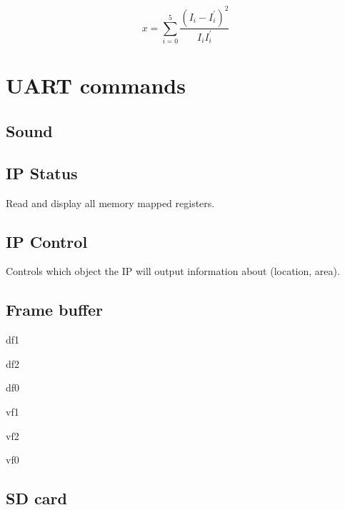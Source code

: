 \documentclass[]{article}
\providecommand{\tightlist}{%
  \setlength{\itemsep}{0pt}\setlength{\parskip}{0pt}}
\begin{document}
\[
x = \sum_{i=0}^5 \frac{(I_i - I^\prime_i) ^ 2}{I_i I^\prime_i}
\]

\section{UART commands}\label{uart-commands}

\subsection{Sound}\label{sound}

\subsection{IP Status}\label{ip-status}

\begin{description}
\tightlist
\item[\texttt{ipinfo}]
Read and display all memory mapped registers.
\end{description}

\subsection{IP Control}\label{ip-control}

\begin{description}
\tightlist
\item[\texttt{setobjid}]
Controls which object the IP will output information about (location,
area).
\end{description}

\subsection{Frame buffer}\label{frame-buffer}

\begin{description}
\tightlist
\item[\texttt{df1}]
df1
\item[\texttt{df2}]
df2
\item[\texttt{df0}]
df0
\item[\texttt{vf1}]
vf1
\item[\texttt{vf2}]
vf2
\item[\texttt{vf0}]
vf0
\end{description}

\subsection{SD card}\label{sd-card}
\end{document}
